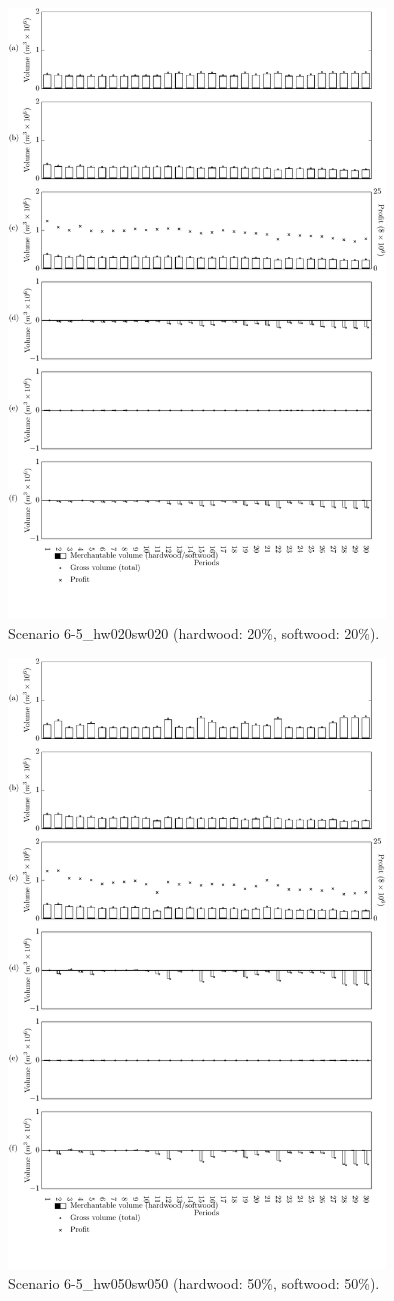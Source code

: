 \begin{figure}[h]
  \centering
  \includegraphics[width=10cm]{images/appendix/s6-5_hw020sw020}
  \caption{Scenario 6-5\_hw020sw020 (hardwood: 20\%, softwood: 20\%).}
  \label{fig:s6-5_hw020sw020}
\end{figure}

\begin{figure}[h]
  \centering
  \includegraphics[width=10cm]{images/appendix/s6-5_hw050sw050}
  \caption{Scenario 6-5\_hw050sw050 (hardwood: 50\%, softwood: 50\%).}
  \label{fig:s6-5_hw050sw050}
\end{figure}
